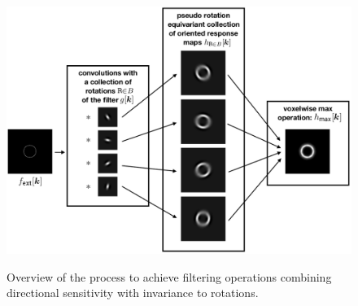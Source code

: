 \documentclass[fleqn,a4paper,oneside,openany]{book}
\begin{document}
%
\begin{figure}
\centering
\includegraphics[trim = 0 0 0 0, clip, width=\linewidth]{LRI_overview.png}\\
\caption{Overview of the process to achieve filtering operations combining directional sensitivity with invariance to rotations.}
  \label{fig:LRI_overview}
\end{figure}
%
\end{document}
